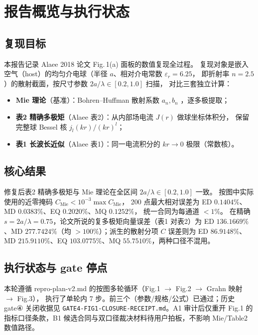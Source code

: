\section{报告概览与执行状态}

\subsection{复现目标}

本报告记录 Alaee 2018 \cite{Alaee2018} 论文 Fig.\,1(a) 面板的数值复现全过程。
复现对象是嵌入空气（host）的均匀介电球（半径 $a$、相对介电常数 $\varepsilon_r=6.25$，
即折射率 $n=2.5$）的散射截面，按尺寸参数 $2a/\lambda\in[0.2,1.0]$ 扫描，
对比三套独立计算：

\begin{itemize}
  \item \textbf{Mie 理论}（基准）：Bohren--Huffman 散射系数 $a_n,b_n$ \cite{Bohren1983}，逐多极提取；
  \item \textbf{表2 精确多极矩}（Alaee 表2）：从内部场电流 $J(r)$ 做球坐标体积分，
        保留完整球 Bessel 核 $j_l(kr)/(kr)^l$；
  \item \textbf{表1 长波长近似}（Alaee 表1）：同一电流积分的 $kr\to0$ 极限（常数核）。
\end{itemize}

\subsection{核心结果}

修复后表2 精确多极矩与 Mie 理论在全区间 $2a/\lambda\in[0.2,1.0]$ 一致。
按图中实际使用的近零掩码 $C_{\mathrm{Mie}}<10^{-3}\max C_{\mathrm{Mie}}$，
200 点最大相对误差为 ED $0.1404\%$、MD $0.0383\%$、EQ $0.2020\%$、MQ $0.1252\%$，
统一合同为每通道 $<1\%$。
在精确 $s=2a/\lambda=0.75$，论文所说的复多极矩向量误差（表1 对表2）为
ED $136.1669\%$、MD $277.7424\%$（均 $>100\%$）；派生的散射分项 $C$ 误差则为
ED $86.9148\%$、MD $215.9110\%$、EQ $103.0775\%$、MQ $55.7510\%$，两种口径不混用。

\subsection{执行状态与 gate 停点}

本轮遵循 repro-plan-v2.md 的按图多轮循环（Fig.1 $\to$ Fig.2 $\to$ Grahn 映射 $\to$ Fig.3），
执行了单轮内 7 步。前三个（参数/规格/公式）已通过；历史 gate④ 关闭收据见
\texttt{GATE4-FIG1-CLOSURE-RECEIPT.md}。A1 审计后仅重开 Fig.1 的指标口径条款，B1
候选合同与双口径裁决材料待用户拍板，不影响 Mie/Table2 数值路径。

